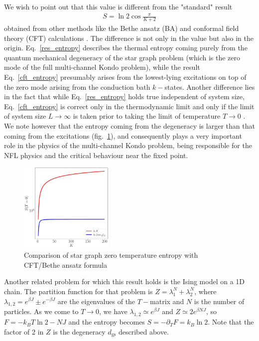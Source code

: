 \documentclass{revtex4-2}
\begin{document}
We wish to point out that this value is different from the "standard" result 
\begin{align}
\label{cft_entropy}
S = \ln 2\cos \frac{\pi}{K+2}
\end{align}
obtained from other methods like the Bethe ansatz (BA) and conformal field theory (CFT) calculations \cite{Gan_Andrei_Coleman_1993,andrei_destri_1984,Tsvelick_weigmann_mchannel_1985,sacramento1989,emery_kivelson,affleck_1991_overscreen}. The difference is not only in the value but also in the origin. Eq.~\ref{res_entropy} describes the thermal entropy coming purely from the quantum mechanical degeneracy of the star graph problem (which is the zero mode of the full multi-channel Kondo problem), while the result Eq.~\ref{cft_entropy} presumably arises from the lowest-lying excitations on top of the zero mode arising from the conduction bath \(k-\)states. Another difference lies in the fact that while Eq.~\ref{res_entropy} holds true independent of system size, Eq.~\ref{cft_entropy} is correct only in the thermodynamic limit and only if the limit of system size \(L \to \infty\) is taken prior to taking the limit of temperature \(T \to 0\) \cite{Gan_Andrei_Coleman_1993,rozhkov_1998,vondelft_prl_1998}. We note however that the entropy coming from the degeneracy is larger than that coming from the excitations (fig.~\ref{entropy_comparison}), and consequently plays a very important role in the physics of the multi-channel Kondo problem, being responsible for the NFL physics and the critical behaviour near the fixed point.

\begin{figure}[!ht]
	\centering
	\includegraphics[width=0.4\textwidth]{../numerics/entropy_comparison.pdf}
	\caption{Comparison of star graph zero temperature entropy with CFT/Bethe ansatz formula}
	\label{entropy_comparison}
\end{figure}


Another related problem for which this result holds is the Ising model on a 1D chain. The partition function for that problem is \(Z = \lambda_1^N + \lambda_2^N\), where \(\lambda_{1,2} = e^{\beta J} \pm e^{-\beta J} \) are the eigenvalues of the \(T-\)matrix and \(N\) is the number of particles. As we come to \(T \to 0\), we have \(\lambda_{1,2} \simeq e^{\beta J}\) and \(Z \simeq 2 e^{\beta N J}\), so \(F = -k_B T \ln 2 - N J\) and the entropy becomes \(S = - \partial_T F = k_B \ln 2\). Note that the factor of 2 in \(Z\) is the degeneracy \(d_\text{gs}\) described above.
\end{document}
